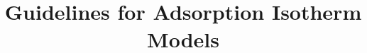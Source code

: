 \documentclass[12pt]{article}
\begin{document}
	\title{Guidelines for Adsorption Isotherm Models}
	\maketitle

	\tableofcontents
	\newpage


	\listofchanges          %
\end{document}
